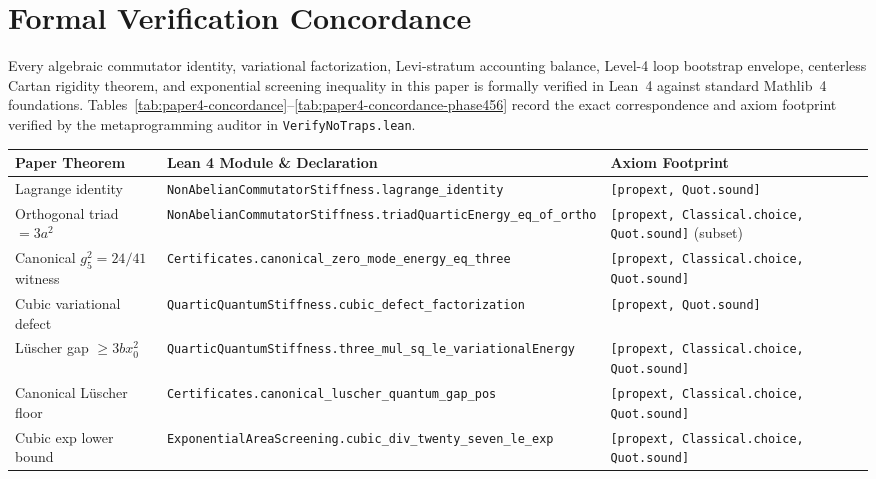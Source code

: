 \documentclass[11pt,a4paper]{article}
\begin{document}
\section{Formal Verification Concordance}
Every algebraic commutator identity, variational factorization, Levi-stratum accounting balance, Level-4 loop bootstrap envelope, centerless Cartan rigidity theorem, and exponential screening inequality in this paper is formally verified in Lean~4 against standard Mathlib~4 foundations. Tables~\ref{tab:paper4-concordance}--\ref{tab:paper4-concordance-phase456} record the exact correspondence and axiom footprint verified by the metaprogramming auditor in \texttt{VerifyNoTraps.lean}.

\begin{table}[ht]
\centering
\scriptsize
\begin{tabular}{@{}p{4.3cm}p{6.6cm}p{3.4cm}@{}}
\toprule
Paper Theorem & Lean 4 Module \& Declaration & Axiom Footprint \\
\midrule
Lagrange identity & \texttt{NonAbelianCommutatorStiffness.}\newline\texttt{lagrange\_identity} & \texttt{[propext, Quot.sound]} \\
Orthogonal triad $= 3a^2$ & \texttt{NonAbelianCommutatorStiffness.}\newline\texttt{triadQuarticEnergy\_eq\_of\_ortho} & \texttt{[propext, Classical.choice,} \texttt{Quot.sound]} (subset) \\
Canonical $g_5^2 = 24/41$ witness & \texttt{Certificates.}\newline\texttt{canonical\_zero\_mode\_energy\_eq\_three} & \texttt{[propext, Classical.choice,} \texttt{Quot.sound]} \\
Cubic variational defect & \texttt{QuarticQuantumStiffness.}\newline\texttt{cubic\_defect\_factorization} & \texttt{[propext, Quot.sound]} \\
L\"uscher gap $\ge 3 b x_0^2$ & \texttt{QuarticQuantumStiffness.}\newline\texttt{three\_mul\_sq\_le\_variationalEnergy} & \texttt{[propext, Classical.choice,} \texttt{Quot.sound]} \\
Canonical L\"uscher floor & \texttt{Certificates.}\newline\texttt{canonical\_luscher\_quantum\_gap\_pos} & \texttt{[propext, Classical.choice,} \texttt{Quot.sound]} \\
Cubic exp lower bound & \texttt{ExponentialAreaScreening.}\newline\texttt{cubic\_div\_twenty\_seven\_le\_exp} & \texttt{[propext, Classical.choice,} \texttt{Quot.sound]} \\

\end{tabular}
\end{table}
\end{document}
